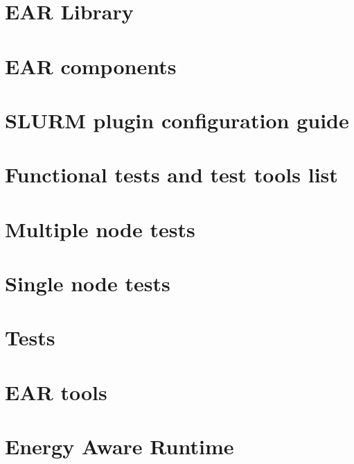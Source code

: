 \documentclass[twoside]{book}
\newcommand{\+}{\discretionary{\mbox{\scriptsize$\hookleftarrow$}}{}{}}
\begin{document}
\chapter{E\+AR Library}
\label{md_src_library_README}
\hypertarget{md_src_library_README}{}

\chapter{E\+AR components}
\label{md_src_README}
\hypertarget{md_src_README}{}

\chapter{S\+L\+U\+RM plugin configuration guide}
\label{md_src_slurm_plugin_README}
\hypertarget{md_src_slurm_plugin_README}{}

\chapter{Functional tests and test tools list}
\label{md_src_tests_functionals_README}
\hypertarget{md_src_tests_functionals_README}{}

\chapter{Multiple node tests}
\label{md_src_tests_plugin_multiple_node_README}
\hypertarget{md_src_tests_plugin_multiple_node_README}{}

\chapter{Single node tests}
\label{md_src_tests_plugin_single_node_README}
\hypertarget{md_src_tests_plugin_single_node_README}{}

\chapter{Tests}
\label{md_src_tests_README}
\hypertarget{md_src_tests_README}{}

\chapter{E\+AR tools}
\label{md_src_tools_README}
\hypertarget{md_src_tools_README}{}

\chapter{Energy Aware Runtime}
\label{md_README}
\hypertarget{md_README}{}

\end{document}
